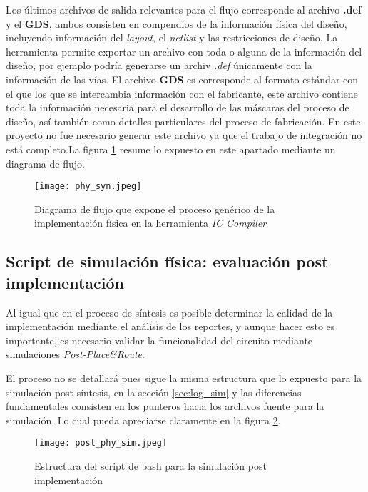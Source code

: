 Los últimos archivos de salida relevantes para el flujo corresponde al archivo \textbf{.def} y el \textbf{GDS}, ambos consisten en compendios de la información física del diseño, incluyendo información del \textit{layout}, el \textit{netlist} y las restricciones de diseño. La herramienta permite exportar un archivo con toda o alguna de la información del diseño, por ejemplo podría generarse un archiv \textit{.def} únicamente con la información de las vías. El archivo \textbf{GDS} es corresponde al formato estándar con el que los que se intercambia información con el fabricante, este archivo contiene toda la información necesaria para el desarrollo de las máscaras del proceso de diseño, así también como detalles particulares del proceso de fabricación. En este proyecto no fue necesario generar este archivo ya que el trabajo de integración no está completo.La figura \ref{fig:phy_script} resume lo expuesto en este apartado mediante un diagrama de flujo.

\begin{figure}[ht]
\texttt{[image: phy\_syn.jpeg]}
\centering
\caption{Diagrama de flujo que expone el proceso genérico de la implementación física en la herramienta \textit{IC Compiler}}
\label{fig:phy_script}
\end{figure}

\subsection{Script de simulación física: evaluación post implementación}

Al igual que en el proceso de síntesis es posible determinar la calidad de la implementación mediante el análisis de los reportes, y aunque hacer esto es importante, es necesario validar la funcionalidad del circuito mediante simulaciones \textit{Post-Place\&Route}.

El proceso no se detallará pues sigue la misma estructura que lo expuesto para la simulación post síntesis, en la sección \ref{sec:log_sim} y las diferencias fundamentales consisten en los punteros hacia los archivos fuente para la simulación. Lo cual pueda apreciarse claramente en la figura \ref{fig:phy_sim}.

\begin{figure}[ht]
\texttt{[image: post\_phy\_sim.jpeg]}
\centering
\caption{Estructura del script de bash para la simulación post implementación}
\label{fig:phy_sim}
\end{figure}

